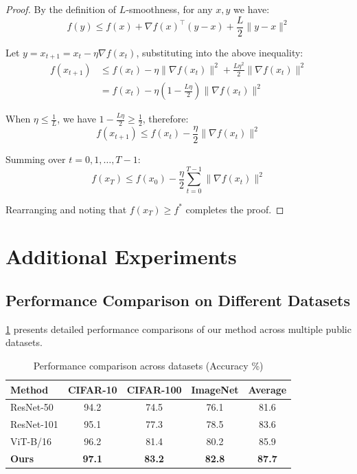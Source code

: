 \documentclass[macnew, en]{manuscript}
\begin{document}
\begin{proof}
    By the definition of $L$-smoothness, for any $x, y$ we have:
    \begin{equation}
        f(y) \leq f(x) + \nabla f(x)^\top(y-x) + \frac{L}{2}\|y-x\|^2
    \end{equation}
    
    Let $y = x_{t+1} = x_t - \eta \nabla f(x_t)$, substituting into the above inequality:
    \begin{align}
        f(x_{t+1}) &\leq f(x_t) - \eta \|\nabla f(x_t)\|^2 + \frac{L\eta^2}{2}\|\nabla f(x_t)\|^2 \\
        &= f(x_t) - \eta\left(1 - \frac{L\eta}{2}\right)\|\nabla f(x_t)\|^2
    \end{align}
    
    When $\eta \leq \frac{1}{L}$, we have $1 - \frac{L\eta}{2} \geq \frac{1}{2}$, therefore:
    \begin{equation}
        f(x_{t+1}) \leq f(x_t) - \frac{\eta}{2}\|\nabla f(x_t)\|^2
    \end{equation}
    
    Summing over $t = 0, 1, \ldots, T-1$:
    \begin{equation}
        f(x_T) \leq f(x_0) - \frac{\eta}{2}\sum_{t=0}^{T-1}\|\nabla f(x_t)\|^2
    \end{equation}
    
    Rearranging and noting that $f(x_T) \geq f^*$ completes the proof.
\end{proof}

\section{Additional Experiments}
\label{app:experiment}

\subsection{Performance Comparison on Different Datasets}

\cref{tab:appendix-results} presents detailed performance comparisons of our method across multiple public datasets.

\begin{table}[h]
    \centering
    \caption{Performance comparison across datasets (Accuracy \%)}
    \label{tab:appendix-results}
    \begin{tabular}{lcccc}
        \toprule
        Method & CIFAR-10 & CIFAR-100 & ImageNet & Average \\
        \midrule
        ResNet-50 & 94.2 & 74.5 & 76.1 & 81.6 \\
        ResNet-101 & 95.1 & 77.3 & 78.5 & 83.6 \\
        ViT-B/16 & 96.2 & 81.4 & 80.2 & 85.9 \\
        \textbf{Ours} & \textbf{97.1} & \textbf{83.2} & \textbf{82.8} & \textbf{87.7} \\
        \bottomrule
    \end{tabular}
\end{table}
\end{document}
